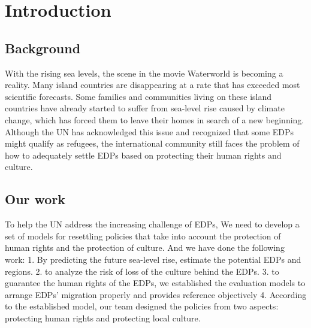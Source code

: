 \documentclass[12pt]{article}  %
\begin{document}
\maketitle  %
\tableofcontents  %


\section{Introduction}
\subsection{Background}



With the rising sea levels, the scene in the movie Waterworld is becoming a reality. Many island countries are disappearing at a rate that has exceeded most scientific forecasts. Some families and communities living on these island countries have already started to suffer from sea-level rise caused by climate change, which has forced them to leave their homes in search of a new beginning. Although the UN has acknowledged this issue and recognized that some EDPs might qualify as refugees, the international community still faces the problem of how to adequately settle EDPs based on protecting their human rights and culture.




\subsection{Our work}
To help the UN address the increasing challenge of EDPs, We need to develop a set of models for resettling policies that take into account the protection of human rights and the protection of culture. And we have done the following work: 
1. By predicting the future sea-level rise, estimate the potential EDPs and regions.
2. to analyze the risk of loss of the culture behind the EDPs. 
3. to guarantee the human rights of the EDPs, we established the evaluation models to arrange EDPs’ migration properly and provides  reference objectively 
4. According to the established model, our team designed the policies from two aspects: protecting human rights and protecting local culture.
\end{document}
